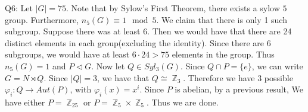 \documentclass[letterpaper]{article}
\DeclareMathOperator{\Z}{\mathbb{Z}}
\newcommand{\normal}{\triangleleft}
\begin{document}
\noindent Q6: Let $|G| = 75$. Note that by Sylow's First Theorem, there exists a sylow $5$ group. Furthermore, $n_5(G) \equiv 1 \mod{5}$. We claim that there is only 1 such subgroup. Suppose there was at least 6. Then we would have that there are 24 distinct elements in each group(excluding the identity).
Since there are 6 subgroups, we would have at least $6\cdot 24>75$ elements in the group. Thus $n_5(G) = 1$ and $P \normal G$. Now let $Q \in Syl_3(G)$. Since $Q \cap P = \{e\}$, we can write $G = N \rtimes Q$. Since $|Q| =3$, we have that $Q \cong \Z_3$. Therefore we have $3$ possible $\varphi_i: Q \to Aut(P)$, with $\varphi_i(x) = x^i$. Since $P$ is abelian, by a previous result, We have either $P = \Z_{25}$ or $P = \Z_5 \times \Z_5$. Thus we are done.  
\end{document}

